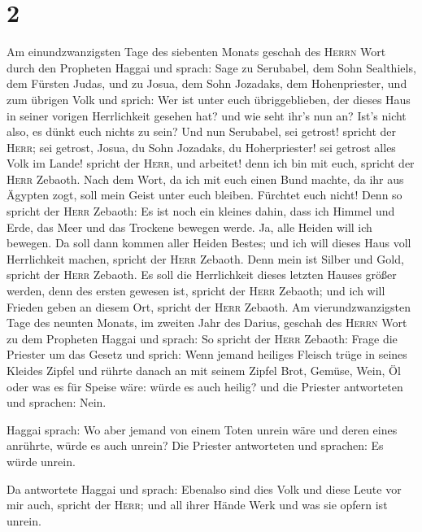 \hypertarget{section-1}{%
\section{2}\label{section-1}}

 Am einundzwanzigsten Tage des siebenten Monats geschah
des \textsc{Herrn} Wort durch den Propheten Haggai und sprach:
 Sage zu Serubabel, dem Sohn Sealthiels, dem Fürsten
Judas, und zu Josua, dem Sohn Jozadaks, dem Hohenpriester, und zum
übrigen Volk und sprich:  Wer ist unter euch
übriggeblieben, der dieses Haus in seiner vorigen Herrlichkeit gesehen
hat? und wie seht ihr's nun an? Ist's nicht also, es dünkt euch nichts
zu sein?  Und nun Serubabel, sei getrost! spricht der
\textsc{Herr}; sei getrost, Josua, du Sohn Jozadaks, du Hoherpriester!
sei getrost alles Volk im Lande! spricht der \textsc{Herr}, und
arbeitet! denn ich bin mit euch, spricht der \textsc{Herr} Zebaoth.
 Nach dem Wort, da ich mit euch einen Bund machte, da ihr
aus Ägypten zogt, soll mein Geist unter euch bleiben. Fürchtet euch
nicht!  Denn so spricht der \textsc{Herr} Zebaoth: Es ist
noch ein kleines dahin, dass ich Himmel und Erde, das Meer und das
Trockene bewegen werde.  Ja, alle Heiden will ich bewegen.
Da soll dann kommen aller Heiden Bestes; und ich will dieses Haus voll
Herrlichkeit machen, spricht der \textsc{Herr} Zebaoth. 
Denn mein ist Silber und Gold, spricht der \textsc{Herr} Zebaoth.
 Es soll die Herrlichkeit dieses letzten Hauses größer
werden, denn des ersten gewesen ist, spricht der \textsc{Herr} Zebaoth;
und ich will Frieden geben an diesem Ort, spricht der \textsc{Herr}
Zebaoth.  Am vierundzwanzigsten Tage des neunten Monats,
im zweiten Jahr des Darius, geschah des \textsc{Herrn} Wort zu dem
Propheten Haggai und sprach:  So spricht der
\textsc{Herr} Zebaoth: Frage die Priester um das Gesetz und sprich:
 Wenn jemand heiliges Fleisch trüge in seines Kleides
Zipfel und rührte danach an mit seinem Zipfel Brot, Gemüse, Wein, Öl
oder was es für Speise wäre: würde es auch heilig? und die Priester
antworteten und sprachen: Nein.

 Haggai sprach: Wo aber jemand von einem Toten unrein
wäre und deren eines anrührte, würde es auch unrein? Die Priester
antworteten und sprachen: Es würde unrein.

 Da antwortete Haggai und sprach: Ebenalso sind dies Volk
und diese Leute vor mir auch, spricht der \textsc{Herr}; und all ihrer
Hände Werk und was sie opfern ist unrein.

